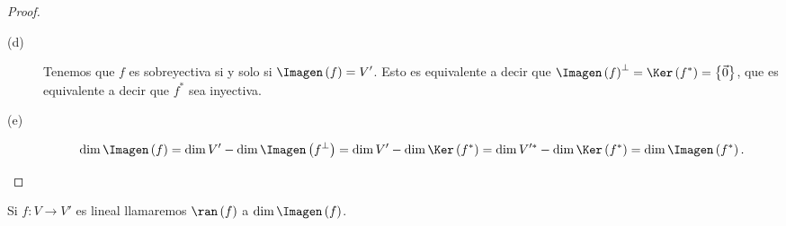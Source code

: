 \begin{proof}
\begin{description}
\item[(d)] Tenemos que $\displaystyle f $ es sobreyectiva si y solo si $\displaystyle \Imagen\left(f\right) = V' $. Esto es equivalente a decir que $\displaystyle \Imagen\left(f\right)^{\perp } = \Ker\left(f^{*}\right)= \left\{ \vec{0}\right\}  $, que es equivalente a decir que $\displaystyle f^{*} $ sea inyectiva.
\item[(e)] 
	\[\dim \Imagen\left(f\right) = \dim V'- \dim\Imagen \left(f^{\perp}\right) = \dim V' - \dim \Ker\left(f^{*}\right) = \dim V'^{*} - \dim \Ker\left(f^{*}\right) = \dim \Imagen\left(f^{*}\right) .\]
\end{description}
\end{proof}

\begin{fdefinition}[]
\normalfont Si $\displaystyle f: V \to V' $ es lineal llamaremos $\displaystyle \ran\left(f\right) $ a $\displaystyle \dim \Imagen\left(f\right) $.
\end{fdefinition}

